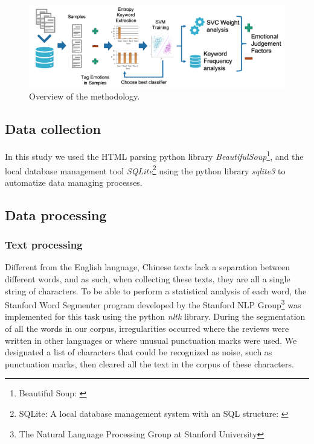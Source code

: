 \documentclass[review]{elsarticle}
\begin{document}
\begin{figure}[bp]
\centering
\includegraphics[width=\textwidth]{method-overview.png}
\caption{Overview of the methodology.}
\label{fig:method-overview}
\end{figure}

\subsection{Data collection}\label{datacollection}

In this study we used the HTML parsing python library \textit{BeautifulSoup}\footnote{\label{bs4}Beautiful Soup: \href {https://www.crummy.com/software/BeautifulSoup/}{}}, and the local database management tool \textit{SQLite}\footnote{\label{sqlite}SQLite: A local database management system with an SQL structure: \href {https://www.sqlite.org/}{}} using the python library \textit{sqlite3} to automatize data managing processes.

\subsection{Data processing}\label{dataprocessing}

\subsubsection{Text processing}\label{textprocessing}

Different from the English language, Chinese texts lack a separation between different words, and as such, when collecting these texts, they are all a single string of characters. To be able to perform a statistical analysis of each word, the Stanford Word Segmenter \cite[][]{chang2008} program developed by the Stanford NLP Group\footnote{\label{stanfordnlp}The Natural Language Processing Group at Stanford University} was implemented for this task using the python \textit{nltk} library. During the segmentation of all the words in our corpus, irregularities occurred where the reviews were written in other languages or where unusual punctuation marks were used. We designated a list of characters that could be recognized as noise, such as punctuation marks, then cleared all the text in the corpus of these characters. 
\end{document}
